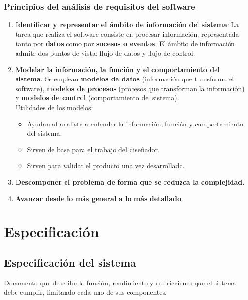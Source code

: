 \subsubsection{Principios del análisis de requisitos del software}
\begin{enumerate}
    \item \textbf{Identificar y representar el ámbito de información del sistema}: La tarea que realiza el software consiste en procesar información, representada tanto por \textbf{datos} como por \textbf{sucesos o eventos}. El ámbito de información admite dos puntos de vista: flujo de datos y flujo de control.
    \item \textbf{Modelar la información, la función y el comportamiento del sistema}: Se emplean \textbf{modelos de datos} (información que transforma el software), \textbf{modelos de procesos} (procesos que transforman la información) y \textbf{modelos de control} (comportamiento del sistema).\\
          Utilidades de los modelos:
          \begin{itemize}
              \item Ayudan al analista a entender la información, función y comportamiento del sistema.
              \item Sirven de base para el trabajo del diseñador.
              \item Sirven para validar el producto una vez desarrollado.
          \end{itemize}
    \item \textbf{Descomponer el problema de forma que se reduzca la complejidad.}
    \item \textbf{Avanzar desde lo más general a lo más detallado.}
\end{enumerate}


\section{Especificación}

\subsection{Especificación del sistema}
Documento que describe la función, rendimiento y restricciones que el sistema debe cumplir, limitando cada uno de sus componentes.\\

